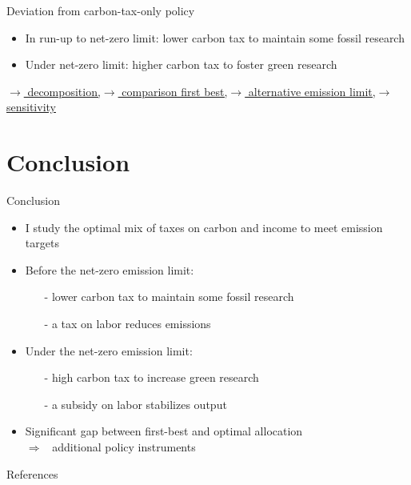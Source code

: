 \documentclass[11pt,aspectratio=169]{beamer}
\newcommand{\ar}{$\Rightarrow$ \ }
\begin{document}
\begin{frame}{Deviation from carbon-tax-only policy}
\begin{figure}
\begin{subfigure}{0.4\textwidth}
	\end{subfigure}
\end{figure}
\vspace{3mm}
\begin{block}{}
	\begin{itemize}
		\item In run-up to net-zero limit: lower carbon tax to maintain some fossil research
		\item Under net-zero limit: higher carbon tax to foster green research
	\end{itemize}
\end{block}	

\vspace{-3mm}
\hfill	\hyperlink{decomp}{\tiny{$\rightarrow$ decomposition,}}\hyperlink{compfb}{\tiny{$\rightarrow$ comparison first best,}}\hyperlink{altemsdecomp}{\tiny{$\rightarrow$ alternative emission limit,}}\hyperlink{sensphi}{\tiny{$\rightarrow$ sensitivity}}
\hypertarget{mec}{}
\end{frame}




\hypertarget{conc}{}
\section{Conclusion}
\begin{frame}{Conclusion}
\begin{itemize}[<+-| alert@+>]
	\item I study the optimal mix of taxes on carbon and income to meet emission targets
	\vspace{3mm}
	
	\item Before the net-zero emission limit: 
	\begin{itemize}
		\item[-]  lower carbon tax to maintain some fossil research
		\item[-] a tax on labor reduces emissions
	\end{itemize}
	\vspace{3mm}
	\item Under the net-zero emission limit: 
	\begin{itemize}
		\item[-] high carbon tax to increase green research
		\item[-]  a subsidy on labor stabilizes output
	\end{itemize}
	\item Significant gap between first-best and optimal allocation\\ \ar additional policy instruments
\end{itemize}
\end{frame}
\begin{frame}[shrink]{References}



\end{frame}
\end{document}
